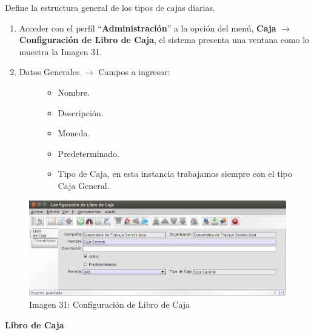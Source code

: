 \documentclass[letterpaper,10pt,spanish]{sphinxmanual}
\begin{document}
Define la estructura general de los tipos de cajas diarias.
\begin{enumerate}
\item {} 
Acceder con el perfil ``\textbf{Administración}'' a la opción del menú, \textbf{Caja} \(\rightarrow\)  \textbf{Configuración de Libro de Caja}, el sistema presenta una ventana como lo muestra la Imagen 31.

\item {} \begin{description}
\item[{Datos Generales \(\rightarrow\) Campos a ingresar:}] \leavevmode\begin{itemize}
\item {} 
Nombre.

\item {} 
Descripción.

\item {} 
Moneda.

\item {} 
Predeterminado.

\item {} 
Tipo de Caja, en esta instancia trabajamos siempre con el tipo Caja General.

\end{itemize}

\end{description}

\end{enumerate}
\begin{figure}[htbp]
\centering
\capstart

\includegraphics{ly_cajas_31.png}
\caption{Imagen 31: Configuración de Libro de Caja}\end{figure}

\textbf{Libro de Caja}
\end{document}
